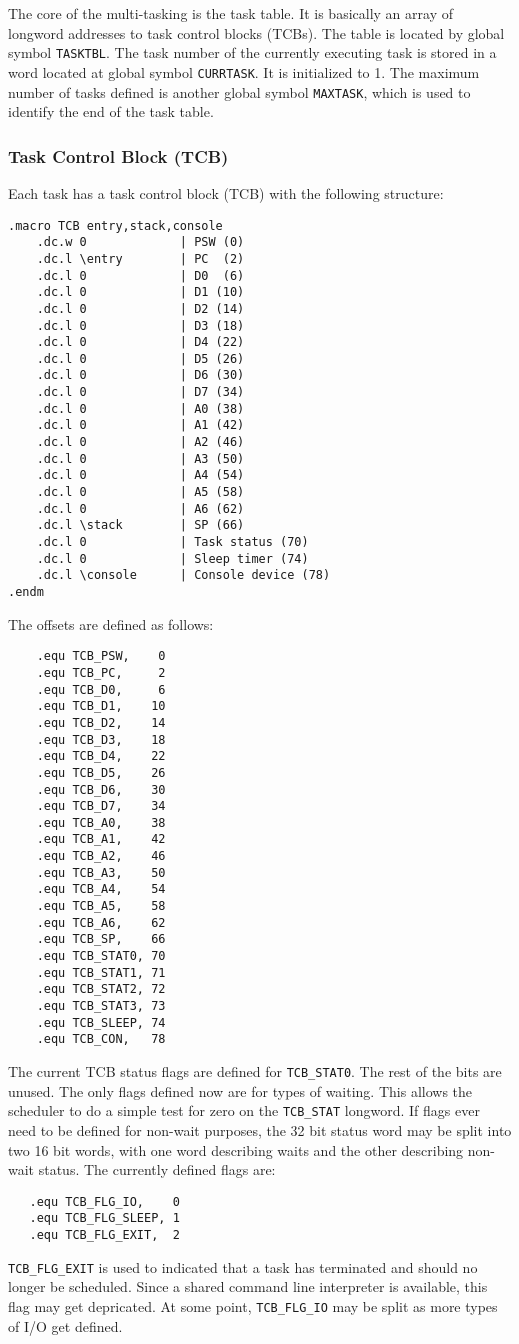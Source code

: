 \documentclass[10pt]{book}
\begin{document}
The core of the multi-tasking is the task table.  It is basically an array of longword addresses to task control blocks (TCBs).  The table is located by global symbol \verb|TASKTBL|.  The task number of the currently executing task is stored in a word located at global symbol \verb|CURRTASK|.  It is initialized to 1.  The maximum number of tasks defined is another global symbol \verb|MAXTASK|, which is used to identify the end of the task table.
\subsubsection{Task Control Block (TCB)}
Each task has a task control block (TCB) with the following structure:
\begin{lstlisting}
.macro TCB entry,stack,console
    .dc.w 0             | PSW (0)
    .dc.l \entry        | PC  (2)
    .dc.l 0             | D0  (6)
    .dc.l 0             | D1 (10)
    .dc.l 0             | D2 (14)
    .dc.l 0             | D3 (18)
    .dc.l 0             | D4 (22)
    .dc.l 0             | D5 (26)
    .dc.l 0             | D6 (30)
    .dc.l 0             | D7 (34)
    .dc.l 0             | A0 (38)
    .dc.l 0             | A1 (42)
    .dc.l 0             | A2 (46)
    .dc.l 0             | A3 (50)
    .dc.l 0             | A4 (54)
    .dc.l 0             | A5 (58)
    .dc.l 0             | A6 (62)
    .dc.l \stack        | SP (66)
    .dc.l 0             | Task status (70)
    .dc.l 0             | Sleep timer (74)
    .dc.l \console      | Console device (78)
.endm
\end{lstlisting}

The offsets are defined as follows:
\begin{lstlisting}
    .equ TCB_PSW,    0
    .equ TCB_PC,     2
    .equ TCB_D0,     6
    .equ TCB_D1,    10
    .equ TCB_D2,    14
    .equ TCB_D3,    18
    .equ TCB_D4,    22
    .equ TCB_D5,    26
    .equ TCB_D6,    30
    .equ TCB_D7,    34
    .equ TCB_A0,    38
    .equ TCB_A1,    42
    .equ TCB_A2,    46
    .equ TCB_A3,    50
    .equ TCB_A4,    54
    .equ TCB_A5,    58
    .equ TCB_A6,    62
    .equ TCB_SP,    66
    .equ TCB_STAT0, 70
    .equ TCB_STAT1, 71
    .equ TCB_STAT2, 72
    .equ TCB_STAT3, 73
    .equ TCB_SLEEP, 74
    .equ TCB_CON,   78
\end{lstlisting}

The current TCB status flags are defined for \verb|TCB_STAT0|.  The rest of the bits are unused.  The only flags defined now are for types of waiting.  This allows the scheduler to do a simple test for zero on the \verb|TCB_STAT| longword.  If flags ever need to be defined for non-wait purposes, the 32 bit status word may be split into two 16 bit words, with one word describing waits and the other describing non-wait status.  The currently defined flags are:
\begin{lstlisting}
   .equ TCB_FLG_IO,    0
   .equ TCB_FLG_SLEEP, 1
   .equ TCB_FLG_EXIT,  2
\end{lstlisting}
\verb|TCB_FLG_EXIT| is used to indicated that a task has terminated and should no longer be scheduled.  Since a shared command line interpreter is available, this flag may get depricated.  At some point, \verb|TCB_FLG_IO| may be split as more types of I/O get defined.
\end{document}
